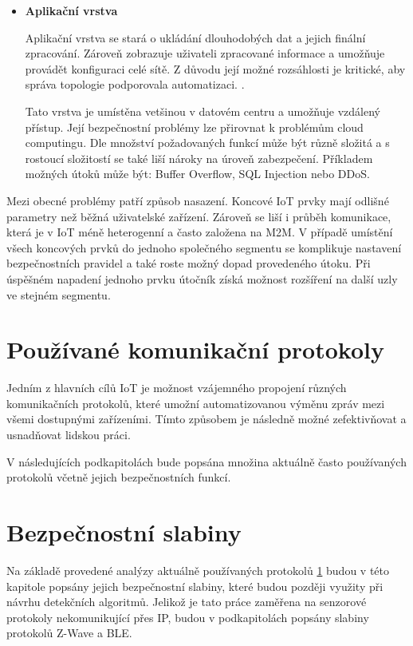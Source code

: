 \begin{itemize}
 \newpage
 \item \textbf{Aplikační vrstva}
 
 Aplikační vrstva se stará o ukládání dlouhodobých dat a jejich finální zpracování. 
 Zároveň zobrazuje uživateli zpracované informace a umožňuje provádět konfiguraci
 celé sítě. Z důvodu její možné rozsáhlosti je kritické, aby správa
 topologie podporovala automatizaci. \cite{secFramework}.
 
 Tato vrstva je umístěna vetšinou v datovém centru a umožňuje vzdálený přístup. 
 Její bezpečnostní problémy lze přirovnat k problémům cloud computingu. Dle
 množství požadovaných funkcí může být různě složitá a s rostoucí složitostí
 se také liší nároky na úroveň zabezpečení. Příkladem možných útoků může být:
 Buffer Overflow, SQL Injection nebo DDoS.
 
\end{itemize}

Mezi obecné problémy patří způsob nasazení. Koncové IoT prvky mají odlišné parametry než 
běžná uživatelské zařízení. Zároveň se liší i průběh komunikace, která je v IoT méně heterogenní
a často založena na M2M. V případě umístění všech koncových prvků do jednoho společného segmentu
se komplikuje nastavení bezpečnostních pravidel a také roste možný dopad provedeného útoku. 
Při úspěšném napadení jednoho prvku útočník získá možnost rozšíření na další uzly ve stejném
segmentu.

 
 \newpage
 
 \section{Používané komunikační protokoly} \label{protokoly}
 Jedním z hlavních cílů IoT je možnost vzájemného propojení různých komunikačních protokolů, 
 které umožní automatizovanou výměnu zpráv mezi všemi dostupnými zařízeními. Tímto způsobem
 je následně možné zefektivňovat a usnadňovat lidskou práci.
 
 V následujících podkapitolách bude popsána množina aktuálně často používaných protokolů
 včetně jejich bezpečnostních funkcí.
 
  
   
   \newpage
  \section{Bezpečnostní slabiny}
  Na základě provedené analýzy aktuálně používaných protokolů \ref{protokoly} budou v této kapitole 
  popsány jejich bezpečnostní slabiny, které budou později využity při návrhu 
  detekčních algoritmů. Jelikož je tato práce zaměřena na senzorové protokoly 
  nekomunikující přes IP, budou v podkapitolách popsány slabiny protokolů 
  Z-Wave a BLE.
  
